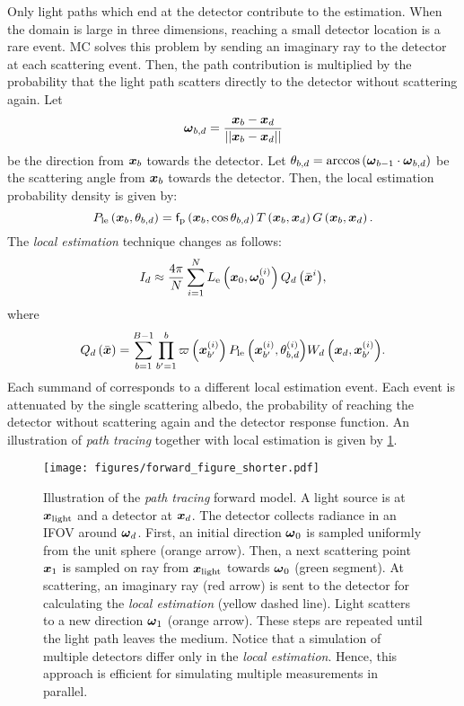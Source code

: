 \documentclass{article}
\begin{document}
Only light paths which end at the detector contribute to the estimation. When the domain is large in three dimensions, reaching a small detector location is a rare event. \ac{MC} solves this problem by sending an imaginary ray to the detector at each scattering event. Then, the path contribution is multiplied by the probability that the light path scatters directly to the detector without scattering again. Let
\begin{equation}
    \boldsymbol{\omega}_{b, d}= \frac{\boldsymbol{x}_{b}-\boldsymbol{x}_{d}}{\left|\left| {\boldsymbol{x}_{b}-\boldsymbol{x}_{d}} \right|\right|}
\end{equation}
be the direction from $\boldsymbol{x}_{b}$ towards the detector. Let $\theta_{b,d}=\arccos\left({\boldsymbol{\omega}_{b-1}\cdot\boldsymbol{\omega}_{b, d}}\right)$ be the scattering angle from $\boldsymbol{x}_{b}$ towards the detector. Then, the local estimation probability density is given by:
\begin{equation}
    P_\text{le}\left({\boldsymbol{x}_{b},\theta_{b,d}}\right)=\mathsf{f}_{\text{p}}\left({\boldsymbol{x}_{b},\cos\theta_{b,d}}\right) T\left({{\boldsymbol{x}_{b}},{\boldsymbol{x}_{d}}}\right) G\left({\boldsymbol{x}_{b},\boldsymbol{x}_{d}}\right).
\end{equation}
The {\em local estimation} technique changes \eq{\ref{eq:explicit_foward}} as follows:
\begin{equation}
   I_{d} \approx \frac{4\pi}{N}\sum_{i=1}^{N}{L_{\text{e}}\left({\boldsymbol{x}_0,\boldsymbol{\omega}^{\left({i}\right)}_0}\right)  Q_{d}\left({\Bar{\boldsymbol{x}}^{i}}\right)},
\end{equation}
where
\begin{equation}
\label{eq:Qd}
    Q_{d}\left({\Bar{\boldsymbol{x}}}\right) = \sum_{b=1}^{B-1}{\prod_{b'=1}^{b}{\varpi\left({\boldsymbol{x}^{\left({i}\right)}_{b'}}\right) P_\text{le}\left({\boldsymbol{x}^{\left({i}\right)}_{b'},\theta^{\left({i}\right)}_{b,d}}\right)}  W_{d}\left({\boldsymbol{x}_{d}, \boldsymbol{x}^{\left({i}\right)}_{b'}}\right)}.
\end{equation}
Each summand of \eq{\ref{eq:Qd}} corresponds to a different local estimation event. Each event is attenuated by the single scattering albedo, the probability of reaching the detector without scattering again and the detector response function.
An illustration of {\em path tracing} together with local estimation is given by \fig\ref{fig:fowrad_simulation}.
\begin{figure}[t]
  \centering
  \texttt{[image: figures/forward\_figure\_shorter.pdf]}
    \caption{Illustration of the {\em path tracing} forward model. A light source is at $\boldsymbol{x}_{\text{light}}$ and a detector at $\boldsymbol{x}_{d}$. The detector collects radiance in an \ac{IFOV} around $\boldsymbol{\omega}_{d}$. First, an initial direction $\boldsymbol{\omega}_0$ is sampled uniformly from the unit sphere (orange arrow). Then, a next scattering point $\boldsymbol{x}_1$ is sampled on ray from $\boldsymbol{x}_{\text{light}}$ towards $\boldsymbol{\omega}_0$ (green segment). At scattering, an imaginary ray (red arrow) is sent to the detector for calculating the {\em local estimation} (yellow dashed line). Light scatters to a new direction $\boldsymbol{\omega}_1$ (orange arrow). These steps are repeated until the light path leaves the medium. Notice that a simulation of multiple detectors differ only in the {\em local estimation}. Hence, this approach is efficient for  simulating multiple measurements in parallel.}
    \label{fig:fowrad_simulation}
\end{figure}
\end{document}
